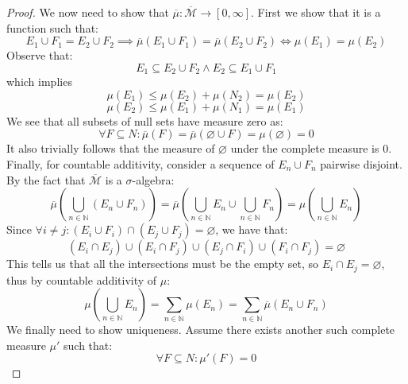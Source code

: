 \documentclass[10pt,letterpaper]{article} %
\begin{document}
\begin{proof}
We now need to show that $\overline{\mu}: \overline{\mathcal{M}} \xrightarrow{} [0, \infty]$. First we show that it is a function such that:
\begin{equation*}
E_1 \cup F_1 = E_2 \cup F_2 \implies \overline{\mu}(E_1 \cup F_1) = \overline{\mu}(E_2 \cup F_2) \iff \mu(E_1) = \mu(E_2)
\end{equation*}
Observe that:
\begin{equation*}
E_1 \subseteq E_2 \cup F_2 \land E_2 \subseteq E_1 \cup F_1
\end{equation*}
which implies
\begin{equation*}
\mu(E_1) \leqslant \mu(E_2) + \mu(N_2) = \mu(E_2)
\end{equation*}
\begin{equation*}
\mu(E_2) \leqslant \mu(E_1) + \mu(N_1) = \mu(E_1)
\end{equation*}
We see that all subsets of null sets have measure zero as:
\begin{equation*}
\forall F \subseteq N: \overline{\mu}(F) = \overline{\mu}(\varnothing \cup F) = \mu(\varnothing) = 0
\end{equation*}
It also trivially follows that the measure of $\varnothing$ under the complete measure is $0$. Finally, for countable additivity, consider a sequence of $E_n \cup F_n$ pairwise disjoint. By the fact that $\overline{\mathcal{M}}$ is a $\sigma$-algebra:
\begin{equation*}
\overline{\mu}\left(\bigcup_{n \in \mathbb{N}}(E_n \cup F_n)\right) = \overline{\mu}\left(\bigcup_{n \in \mathbb{N}}E_n \cup \bigcup_{n \in \mathbb{N}}F_n\right) = \mu\left(\bigcup_{n \in \mathbb{N}}E_n\right)
\end{equation*}
Since $\forall i \neq j: (E_i \cup F_i) \cap (E_j \cup F_j) = \varnothing$, we have that:
\begin{equation*}
(E_i \cap E_j) \cup (E_i \cap F_j) \cup (E_j \cap F_i) \cup (F_i \cap F_j) = \varnothing
\end{equation*}
This tells us that all the intersections must be the empty set, so $E_i \cap E_j = \varnothing$, thus by countable additivity of $\mu$:
\begin{equation*}
\mu\left(\bigcup_{n \in \mathbb{N}}E_n\right) = \sum_{n \in \mathbb{N}}\mu(E_n) = \sum_{n \in \mathbb{N}}\overline{\mu}(E_n \cup F_n)
\end{equation*}
We finally need to show uniqueness. Assume there exists another such complete measure $\mu'$ such that:
\begin{equation*}
\forall F \subseteq N: \mu'(F) = 0

\end{equation*}
\end{proof}
\end{document}
